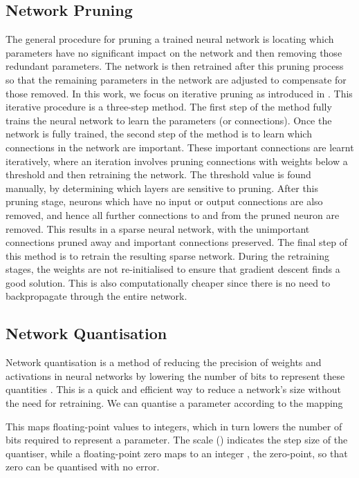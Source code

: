 \documentclass[conference]{IEEEtran}
\begin{document}
\subsection{Network Pruning}
The general procedure for pruning a trained neural network is locating which parameters have no significant impact on the network and then removing those redundant parameters. The network is then retrained after this pruning process so that the remaining parameters in the network are adjusted to compensate for those removed. In this work, we focus on iterative pruning as introduced in \cite{han2015alearning}. This iterative procedure is a three-step method. The first step of the method fully trains the neural network to learn the parameters (or connections). Once the network is fully trained, the second step of the method is to learn which connections in the network are important. These important connections are learnt iteratively, where an iteration involves pruning connections with weights below a threshold and then retraining the network.  The threshold value is found manually, by determining which layers are sensitive to pruning.  After this pruning stage, neurons which have no input or output connections are also removed, and hence all further connections to and from the pruned neuron are removed.  This results in a sparse neural network, with the unimportant connections pruned away and important connections preserved. The final step of this method is to retrain the resulting sparse network. During the retraining stages, the weights are not re-initialised to ensure that gradient descent finds a good solution. This is also computationally cheaper since there is no need to backpropagate through the entire network.


\subsection{Network Quantisation}
Network quantisation is a method of reducing the precision of weights and activations in neural networks by lowering the number of bits to represent these quantities \cite{krishnamoorthi2018quantizing}. This is a quick and efficient way to reduce a network's size without the need for retraining. We can quantise a parameter  according to the mapping

This maps floating-point values to integers, which in turn lowers the number of bits required to represent a parameter. The scale () indicates the step size of the quantiser, while a floating-point zero maps to an integer , the zero-point, so that zero can be quantised with no error.
\end{document}
